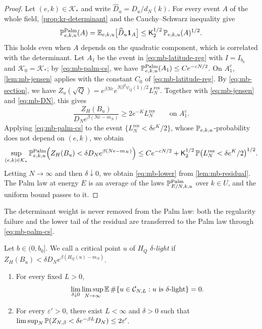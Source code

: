 \begin{proof}
Let $(e,k)\in\mathcal K_*$ and write $\widehat D_u=D_u/d_N(k)$. For every event $A$ of the whole field, \cref{prop:kr-determinant} and the Cauchy--Schwarz inequality give
\begin{equation}\label{eq:mb-palm-cs}
\mathbb P^{\mathrm{Palm}}_{e,k,u}(A)=\mathbb E_{e,k,u}\bigl[\widehat D_u\mathbf 1_A\bigr]\le\mathsf K_2^{1/2}\,\mathbb P_{e,k,u}(A)^{1/2}.
\end{equation}
This holds even when $A$ depends on the quadratic component, which is correlated with the determinant. Let $A_1$ be the event in \eqref{eq:mb-latitude-reg} with $I=I_{b_0}$ and $\mathcal K_0=\mathcal K_*$; by \eqref{eq:mb-palm-cs}, we have $\mathbb P^{\mathrm{Palm}}_{e,k,u}(A_1)\le Ce^{-cN/2}$. On $A_1^c$, \cref{lem:mb-jensen} applies with the constant $C_0$ of \eqref{eq:mb-latitude-reg}. By \eqref{eq:mb-section}, we have $Z_u(\sqrt Q)=e^{\beta Ne}e^{N\beta^2\psi_Q(1)/2}L_N^{\mathrm{res}}$. Together with \eqref{eq:mb-jensen} and \eqref{eq:mb-DN}, this gives
\[
\frac{Z_H(B_u)}{D_Ne^{\beta(Ne-m_N)}}\ge2e^{-K}L_N^{\mathrm{res}}\qquad\text{on }A_1^c .
\]
Applying \eqref{eq:mb-palm-cs} to the event $\{L_N^{\mathrm{res}}<\delta e^K/2\}$, whose $\mathbb P_{e,k,u}$-probability does not depend on $(e,k)$, we obtain
\[
\sup_{(e,k)\in\mathcal K_*}\mathbb P^{\mathrm{Palm}}_{e,k,u}\Bigl(Z_H(B_u)<\delta D_Ne^{\beta(Ne-m_N)}\Bigr)\le Ce^{-cN/2}+\mathsf K_2^{1/2}\,\mathbb P\bigl(L_N^{\mathrm{res}}<\delta e^K/2\bigr)^{1/2}.
\]
Letting $N\to\infty$ and then $\delta\downarrow0$, we obtain \eqref{eq:mb-lower} from \cref{lem:mb-residual}. The Palm law at energy $E$ is an average of the laws $\mathbb P^{\mathrm{Palm}}_{E/N,k,u}$ over $k\in U$, and the uniform bound passes to it.
\end{proof}

The determinant weight is never removed from the Palm law: both the regularity failure and the lower tail of the residual are transferred to the Palm law through \eqref{eq:mb-palm-cs}.

\begin{corollary}\label{cor:mb-bad}
Let $b\in(0,b_0]$. We call a critical point $u$ of $H_Q$ \emph{$\delta$-light} if $Z_H(B_u)<\delta D_Ne^{\beta(H_Q(u)-m_N)}$.
\begin{enumerate}
\item For every fixed $L>0$,
\begin{equation}\label{eq:mb-bad}
\lim_{\delta\downarrow0}\limsup_{N\to\infty}\mathbb E\,\#\{u\in\mathcal C_{N,L}:u\text{ is $\delta$-light}\}=0 .
\end{equation}
\item For every $\varepsilon'>0$, there exist $L<\infty$ and $\delta>0$ such that $\limsup_N\mathbb P(Z_{N,\beta}<\delta e^{-\beta L}D_N)\le2\varepsilon'$.
\end{enumerate}
\end{corollary}

